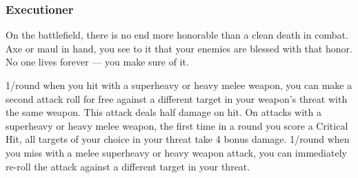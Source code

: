\subsubsection{Executioner}

\begin{talent}
{On the battlefield, there is no end more honorable than a clean death in combat. Axe or maul in hand, you see to it that your enemies are blessed with that honor. No one lives forever — you make sure of it.}

1/round when you hit with a superheavy or heavy melee weapon, you can make a second attack roll for free against a different target in your weapon's threat with the same weapon. This attack deals half damage on hit. 
On attacks with a superheavy or heavy melee weapon, the first time in a round you score a Critical Hit, all targets of your choice in your threat take 4 bonus damage. 
1/round when you miss with a melee superheavy or heavy weapon attack, you can immediately re-roll the attack against a different target in your threat.
\end{talent}